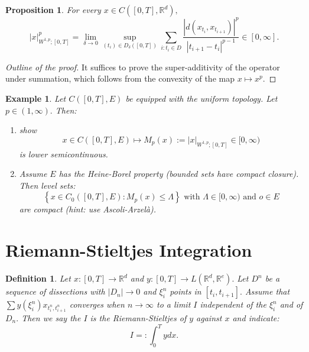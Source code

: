 \documentclass{article}
\newcommand{\R}{\mathbb{R}}
\newtheorem{definition}{Definition}
\newtheorem{prop}[theorem]{Proposition}
\newtheorem{example}{Example}
\begin{document}
\begin{prop}
    For every $x \in C([0,T],\R^d),$ 
\begin{equation}
    |x|_{W^{1,p};[0,T]}^p =\lim_{\delta \rightarrow 0} \sup_{(t_i) \in D_\delta ([0,T])} \sum_{i:t_i \in D} \frac{|d(x_{t_i}, x_{t_{i+1}})|^p}{|t_{i+1} - t_i|^{p-1}} \in [0, \infty].
\end{equation}
\end{prop}
\begin{proof}[Outline of the proof]
    It suffices to prove the super-additivity of the operator under summation, which follows from the convexity of the map $x \mapsto x^p.$
\end{proof}

\begin{example}
    Let $C([0,T], E)$ be equipped with the uniform topology. Let $p \in (1,\infty).$ Then:
    \begin{enumerate}
        \item show
        \begin{equation}
            x \in C([0,T], E) \mapsto M_p(x):= |x|_{W^{1,p};[0,T]} \in [0, \infty) 
        \end{equation}
        is lower semicontinuous.
        \item Assume $E$ has the Heine-Borel property (bounded sets have compact closure). Then level sets:
        \begin{equation}
            \left\{ x \in C_0([0,T], E): M_p(x) \leq \Lambda \right\} \text{ with } \Lambda \in [0, \infty) \text{ and } o \in E
        \end{equation}
        are compact (\textit{hint: use Ascoli-Arzelà}).
    \end{enumerate}
\end{example}

\section{Riemann-Stieltjes Integration}

\begin{definition}
    Let $x:[0,T] \rightarrow \R^d$ and $y:[0,T] \rightarrow L(\R^d, \R^e).$ Let $D^n$ be a sequence of dissections with $|D_n| \rightarrow 0$ and $\xi^n_i$ points in $[t_i, t_{i+1}].$ Assume that $\sum y(\xi^n_i) x_{t^n_i, t^n_{i+1}}$ converges when $n \rightarrow \infty$ to a limit $I$ independent of the $\xi^n_i$ and of $D_n.$ Then we say the $I$ is the Riemann-Stieltjes of $y$ against $x$ and indicate:
    \begin{equation}
        I =: \int_0^T y dx.
    \end{equation}
\end{definition}
\end{document}
